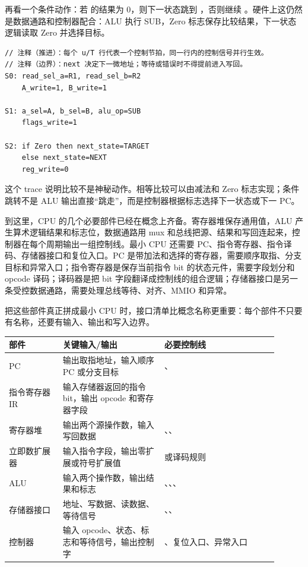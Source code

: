 再看一个条件动作：若  的结果为 0，则下一状态跳到 ，否则继续 。硬件上这仍然是数据通路和控制器配合：ALU 执行 SUB，Zero 标志保存比较结果，下一状态逻辑读取 Zero 并选择目标。

\begin{lstlisting}
// 注释（推进）：每个 u/T 行代表一个控制节拍，同一行内的控制信号并行生效。
// 注释（边界）：next 决定下一微地址；等待或错误时不得提前进入写回。
S0: read_sel_a=R1, read_sel_b=R2
    A_write=1, B_write=1

S1: a_sel=A, b_sel=B, alu_op=SUB
    flags_write=1

S2: if Zero then next_state=TARGET
    else next_state=NEXT
    reg_write=0
\end{lstlisting}

这个 trace 说明比较不是神秘动作。相等比较可以由减法和 Zero 标志实现；条件跳转不是 ALU 输出直接“跳走”，而是控制器根据标志选择下一状态或下一 PC。


到这里，CPU 的几个必要部件已经在概念上齐备。寄存器堆保存通用值，ALU 产生算术逻辑结果和标志位，数据通路用 mux 和总线把源、结果和写回连起来，控制器在每个周期输出一组控制线。最小 CPU 还需要 PC、指令寄存器、指令译码、存储器接口和复位入口。PC 是带加法和选择的寄存器，需要顺序取指、分支目标和异常入口；指令寄存器是保存当前指令 bit 的状态元件，需要字段划分和 opcode 译码；译码器是把 bit 字段翻译成控制线的组合逻辑；存储器接口是另一条受控数据通路，需要处理总线等待、对齐、MMIO 和异常。

把这些部件真正拼成最小 CPU 时，接口清单比概念名称更重要：每个部件不只要有名称，还要有输入、输出和写入边界。

\begin{longtable}{L{0.18\linewidth}L{0.34\linewidth}L{0.38\linewidth}}
\toprule
部件 & 关键输入/输出 & 必要控制线 \\
\midrule
PC & 输出取指地址，输入顺序 PC 或分支目标 & 、 \\\tablerowrule
指令寄存器 IR & 输入存储器返回的指令 bit，输出 opcode 和寄存器字段 &  \\\tablerowrule
寄存器堆 & 输出两个源操作数，输入写回数据 & 、、 \\\tablerowrule
立即数扩展器 & 输入指令字段，输出零扩展或符号扩展值 &  或译码规则 \\\tablerowrule
ALU & 输入两个操作数，输出结果和标志 & 、、、 \\\tablerowrule
存储器接口 & 地址、写数据、读数据、等待信号 & 、、 \\\tablerowrule
控制器 & 输入 opcode、状态、标志和等待信号，输出控制字 & 、复位入口、异常入口 \\
\bottomrule
\end{longtable}

